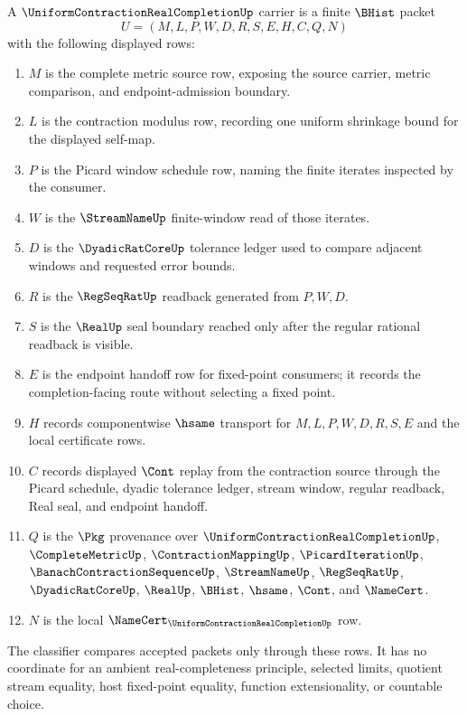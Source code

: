 \begin{definition}
\label{def:uniform-contraction-real-completion-carrier}
A $\UniformContractionRealCompletionUp$ carrier is a finite $\BHist$ packet
$$
U=(M,L,P,W,D,R,S,E,H,C,Q,N)
$$
with the following displayed rows:
\begin{enumerate}
\item $M$ is the complete metric source row, exposing the source carrier, metric comparison, and endpoint-admission boundary.
\item $L$ is the contraction modulus row, recording one uniform shrinkage bound for the displayed self-map.
\item $P$ is the Picard window schedule row, naming the finite iterates inspected by the consumer.
\item $W$ is the $\StreamNameUp$ finite-window read of those iterates.
\item $D$ is the $\DyadicRatCoreUp$ tolerance ledger used to compare adjacent windows and requested error bounds.
\item $R$ is the $\RegSeqRatUp$ readback generated from $P,W,D$.
\item $S$ is the $\RealUp$ seal boundary reached only after the regular rational readback is visible.
\item $E$ is the endpoint handoff row for fixed-point consumers; it records the completion-facing route without selecting a fixed point.
\item $H$ records componentwise $\hsame$ transport for $M,L,P,W,D,R,S,E$ and the local certificate rows.
\item $C$ records displayed $\Cont$ replay from the contraction source through the Picard schedule, dyadic tolerance ledger, stream window, regular readback, Real seal, and endpoint handoff.
\item $Q$ is the $\Pkg$ provenance over $\UniformContractionRealCompletionUp$, $\CompleteMetricUp$, $\ContractionMappingUp$, $\PicardIterationUp$, $\BanachContractionSequenceUp$, $\StreamNameUp$, $\RegSeqRatUp$, $\DyadicRatCoreUp$, $\RealUp$, $\BHist$, $\hsame$, $\Cont$, and $\NameCert$.
\item $N$ is the local $\NameCert_{\UniformContractionRealCompletionUp}$ row.
\end{enumerate}
The classifier compares accepted packets only through these rows. It has no coordinate for an ambient real-completeness principle, selected limits, quotient stream equality, host fixed-point equality, function extensionality, or countable choice.
\end{definition}


